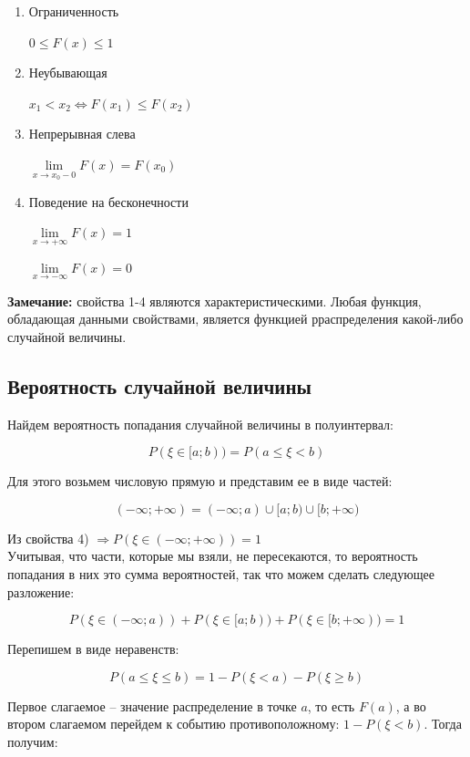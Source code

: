 \documentclass{article}
\begin{document}
\begin{enumerate}
\item Ограниченность

\qquad$0 \leq F(x) \leq 1$

\item Неубывающая

\qquad$x_1 < x_2 \Leftrightarrow F(x_1) \leq F(x_2)$

\item Непрерывная слева

\qquad$\lim\limits_{x \rightarrow x_0 - 0} F(x) = F(x_0)$

\item Поведение на бесконечности

\qquad$ \lim\limits_{x \rightarrow +\infty} F(x) = 1$

\qquad$ \lim\limits_{x \rightarrow -\infty} F(x) = 0$

\end{enumerate}


\textbf{Замечание:} свойства 1-4 являются характеристическими. Любая функция, обладающая данными свойствами, является функцией рраспределения какой-либо случайной величины.

\subsection{Вероятность случайной величины}

Найдем вероятность попадания случайной величины в полуинтервал:

$$P(\xi \in [a; b)) = P(a \leq \xi < b)$$


Для этого возьмем числовую прямую и представим ее в виде частей:

$$(-\infty; +\infty) = (-\infty; a)\cup[a; b)\cup[b; +\infty)$$

Из свойства 4) $\Rightarrow P(\xi \in (-\infty; +\infty)) = 1$
\\

Учитывая, что части, которые мы взяли, не пересекаются, то вероятность попадания в них это сумма вероятностей, так что можем сделать следующее разложение:

$$P(\xi \in (-\infty; a)) + P(\xi \in [a; b)) + P(\xi \in [b; +\infty)) = 1$$

Перепишем в виде неравенств:

$$ P(a \leq \xi \leq b) = 1 - P(\xi < a) - P(\xi \geq b)$$

Первое слагаемое -- значение распределение в точке $a$, то есть $F(a)$, а во втором слагаемом перейдем к событию противоположному: $1 - P(\xi < b)$. Тогда получим:
\end{document}
